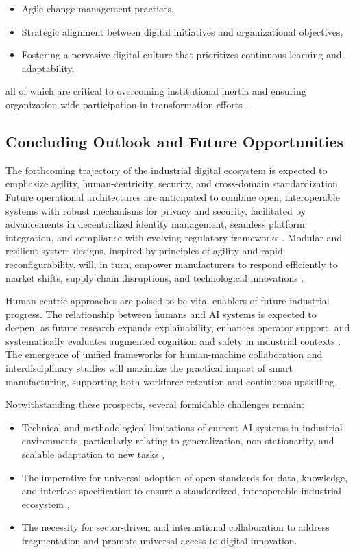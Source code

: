 \begin{itemize}
    \item Agile change management practices,
    \item Strategic alignment between digital initiatives and organizational objectives,
    \item Fostering a pervasive digital culture that prioritizes continuous learning and adaptability,
\end{itemize}

all of which are critical to overcoming institutional inertia and ensuring organization-wide participation in transformation efforts \cite{ref25}\cite{ref31}\cite{ref35}.

\subsection{Concluding Outlook and Future Opportunities}

The forthcoming trajectory of the industrial digital ecosystem is expected to emphasize agility, human-centricity, security, and cross-domain standardization. Future operational architectures are anticipated to combine open, interoperable systems with robust mechanisms for privacy and security, facilitated by advancements in decentralized identity management, seamless platform integration, and compliance with evolving regulatory frameworks \cite{ref41}\cite{ref86}\cite{ref93}. Modular and resilient system designs, inspired by principles of agility and rapid reconfigurability, will, in turn, empower manufacturers to respond efficiently to market shifts, supply chain disruptions, and technological innovations \cite{ref3}\cite{ref68}.

Human-centric approaches are poised to be vital enablers of future industrial progress. The relationship between humans and AI systems is expected to deepen, as future research expands explainability, enhances operator support, and systematically evaluates augmented cognition and safety in industrial contexts \cite{ref45}\cite{ref83}. The emergence of unified frameworks for human-machine collaboration and interdisciplinary studies will maximize the practical impact of smart manufacturing, supporting both workforce retention and continuous upskilling \cite{ref86}\cite{ref94}.

Notwithstanding these prospects, several formidable challenges remain:

\begin{itemize}
    \item Technical and methodological limitations of current AI systems in industrial environments, particularly relating to generalization, non-stationarity, and scalable adaptation to new tasks \cite{ref19}\cite{ref20}\cite{ref54},
    \item The imperative for universal adoption of open standards for data, knowledge, and interface specification to ensure a standardized, interoperable industrial ecosystem \cite{ref13}\cite{ref86},
    \item The necessity for sector-driven and international collaboration to address fragmentation and promote universal access to digital innovation.
\end{itemize}

